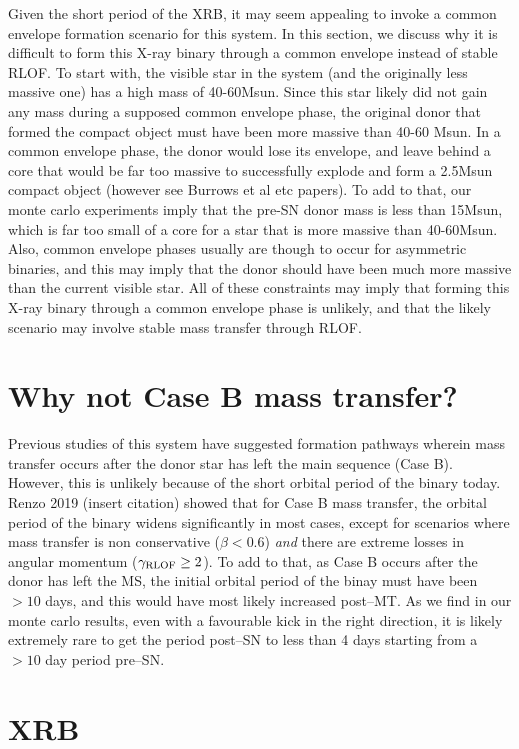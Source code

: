 \documentclass[linenumbers,trackchanges,twocolumn]{aastex701}
\begin{document}
Given the short period of the XRB, it may seem appealing to invoke a common envelope formation scenario for this system. In this section, we discuss why it is difficult to form this X-ray binary through a common envelope instead of stable RLOF. To start with, the visible star in the system (and the originally less massive one) has a high mass of 40-60Msun. Since this star likely did not gain any mass during a supposed common envelope phase, the original donor that formed the compact object must have been more massive than 40-60 Msun. In a common envelope phase, the donor would lose its envelope, and leave behind a core that would be far too massive to successfully explode and form a 2.5Msun compact object (however see Burrows et al etc papers). To add to that, our monte carlo experiments imply that the pre-SN donor mass is less than 15Msun, which is far too small of a core for a star that is more massive than 40-60Msun. Also, common envelope phases usually are though to occur for asymmetric binaries, and this may imply that the donor should have been much more massive than the current visible star. All of these constraints may imply that forming this X-ray binary through a common envelope phase is unlikely, and that the likely scenario may involve stable mass transfer through RLOF.

\section{Why not Case B mass transfer?}

Previous studies of this system have suggested formation pathways wherein mass transfer occurs after the donor star has left the main sequence (Case B). However, this is unlikely because of the short orbital period of the binary today. Renzo 2019 (insert citation) showed that for Case B mass transfer, the orbital period of the binary widens significantly in most cases, except for scenarios where mass transfer is non conservative ($\beta < 0.6$) \textit{and} there are extreme losses in angular momentum ($\gamma_{\rm RLOF} \geq 2$). To add to that, as Case B occurs after the donor has left the MS, the initial orbital period of the binay must have been $>10$ days, and this would have most likely increased post--MT. As we find in our monte carlo results, even with a favourable kick in the right direction, it is likely extremely rare to get the period post--SN to less than 4 days starting from a $>10$ day period pre--SN.

\section{XRB}
\end{document}
